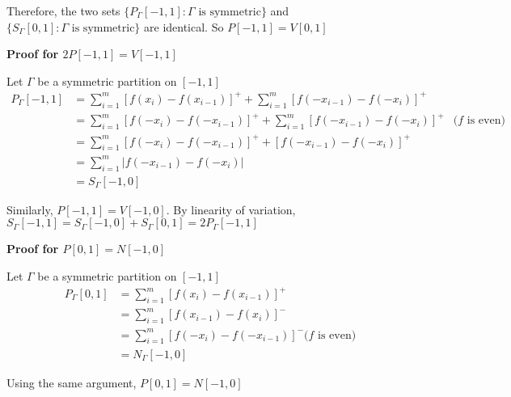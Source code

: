 \documentclass{article}
\begin{document}
Therefore, the two sets $\{ P_\Gamma[-1, 1]: \Gamma \text{ is symmetric}\}$ and $\{ S_\Gamma[0, 1]: \Gamma \text{ is symmetric}\}$ are identical. So $P[-1, 1] = V[0, 1]$



\textbf{Proof for $2 P[-1, 1] = V[-1, 1]$}

Let $\Gamma$ be a symmetric partition on $[-1, 1]$
\begin{align*}
    P_\Gamma[-1, 1]
        &= \sum_{i=1}^m [f(x_i) - f(x_{i-1})]^+ + \sum_{i=1}^m [f(-x_{i-1}) - f(-x_i)]^+ \\
        &= \sum_{i=1}^m [f(-x_i) - f(-x_{i-1})]^+ + \sum_{i=1}^m [f(-x_{i-1}) - f(-x_i)]^+ &\text{($f$ is even)} \\
        &= \sum_{i=1}^m [f(-x_i) - f(-x_{i-1})]^+ + [f(-x_{i-1}) - f(-x_i)]^+ \\
        &= \sum_{i=1}^m \left|f(-x_{i-1}) - f(-x_i)\right| \\
        &= S_\Gamma[-1, 0]
\end{align*}

Similarly, $P[-1, 1] = V[-1, 0]$. By linearity of variation, $S_\Gamma[-1, 1] = S_\Gamma[-1, 0] + S_\Gamma[0, 1] = 2 P_\Gamma[-1, 1]$

\textbf{Proof for $P[0, 1] = N[-1, 0]$}

Let $\Gamma$ be a symmetric partition on $[-1, 1]$
\begin{align*}
    P_\Gamma[0, 1]
        &= \sum_{i=1}^m [f(x_i) - f(x_{i-1})]^+ \\
        &= \sum_{i=1}^m [f(x_{i-1}) - f(x_i)]^- \\
        &= \sum_{i=1}^m [f(-x_i) - f(-x_{i-1})]^- \text{($f$ is even)}\\
        &= N_\Gamma[-1, 0]
\end{align*}

Using the same argument, $P[0, 1] = N[-1, 0]$
\end{document}
